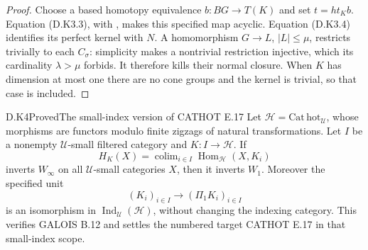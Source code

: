 \begin{proof}
Choose a based homotopy equivalence $b:BG\to T(K)$ and
set $t=h t_K b$. Equation (D.K3.3), with
\citet[Definition/Proposition~1.2]{AHausmannHusemoller1979},
makes this specified map acyclic. Equation (D.K3.4)
identifies its perfect kernel with $N$. A homomorphism
$G\to L$, $|L|\leq\mu$, restricts trivially to each
$C_\sigma$: simplicity makes a nontrivial restriction
injective, which its cardinality $\lambda>\mu$ forbids.
It therefore kills their normal closure. When $K$ has
dimension at most one there are no cone groups and the
kernel is trivial, so that case is included.
\end{proof}

\begin{result}{D.K4}{Proved}{The small-index version of CATHOT E.17}
Let $\mathcal H=\mathrm{Cat\,hot}_{\mathcal U}$, whose morphisms
are functors modulo finite zigzags of natural transformations.
Let $I$ be a nonempty $\mathcal U$-small filtered category and
$K:I\to\mathcal H$. If
\[
 H_K(X)=\operatorname{colim}_{i\in I}
                 \operatorname{Hom}_{\mathcal H}(X,K_i)
\]
inverts $W_\infty$ on all $\mathcal U$-small categories $X$,
then it inverts $W_1$. Moreover the specified unit
\[
 (K_i)_{i\in I}\longrightarrow(\Pi_1K_i)_{i\in I}
\]
is an isomorphism in $\operatorname{Ind}_{\mathcal U}(\mathcal H)$,
without changing the indexing category. This verifies GALOIS B.12
and settles the numbered target CATHOT E.17 in that small-index scope.
\end{result}
